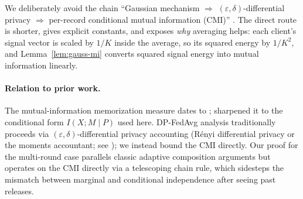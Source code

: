 We deliberately avoid the chain ``Gaussian mechanism \(\Rightarrow\) \((\varepsilon,\delta)\)-differential privacy \(\Rightarrow\) per-record conditional mutual information (CMI)'' \citep[e.g.][]{BunSteinke2016,SteinkeUllman2017,Bassily2018ConcurrentCMI}. The direct route is shorter, gives explicit constants, and exposes \emph{why} averaging helps: each client's signal vector is scaled by \(1/K\) inside the average, so its squared energy by \(1/K^2\), and Lemma~\ref{lem:gauss-mi} converts squared signal energy into mutual information linearly.

\paragraph{Relation to prior work.} The mutual-information memorization measure dates to \citet{Bassily2018ConcurrentCMI,Russo2016ControllingBias}; \citet{Brown2021Memorization} sharpened it to the conditional form \(I(X;M\mid P)\) used here. DP-FedAvg analysis traditionally proceeds via \((\varepsilon,\delta)\)-differential privacy accounting (R\'enyi differential privacy or the moments accountant; see \citealt{Abadi2016DPSGD,KairouzMcMahan2021Practical}); we instead bound the CMI directly. Our proof for the multi-round case parallels classic adaptive composition arguments but operates on the CMI directly via a telescoping chain rule, which sidesteps the mismatch between marginal and conditional independence after seeing past releases.
